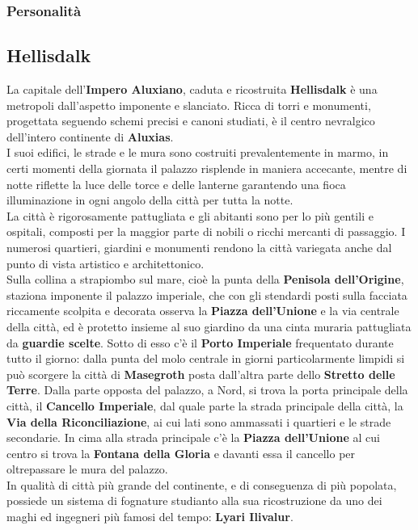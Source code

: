 \documentclass[10pt,twoside,onecolumn,openany]{book}
\begin{document}
\subsubsection{Personalità}
\newpage
\subsection{Hellisdalk}
La capitale dell'\textbf{Impero Aluxiano}, caduta e ricostruita \textbf{Hellisdalk} è una metropoli dall'aspetto imponente e slanciato. Ricca di torri e monumenti, progettata seguendo schemi precisi e canoni studiati, è il centro nevralgico dell'intero continente di \textbf{Aluxias}.\\
I suoi edifici, le strade e le mura sono costruiti prevalentemente in marmo, in certi momenti della giornata il palazzo risplende in maniera accecante, mentre di notte riflette la luce delle torce e delle lanterne garantendo una fioca illuminazione in ogni angolo della città per tutta la notte.\\
La città è rigorosamente pattugliata e gli abitanti sono per lo più gentili e ospitali, composti per la maggior parte di nobili o ricchi mercanti di passaggio. I numerosi quartieri, giardini e monumenti rendono la città variegata anche dal punto di vista artistico e architettonico.\\
Sulla collina a strapiombo sul mare, cioè la punta della \textbf{Penisola dell'Origine}, staziona imponente il palazzo imperiale, che con gli stendardi posti sulla facciata riccamente scolpita e decorata osserva la \textbf{Piazza dell'Unione} e la via centrale della città, ed è protetto insieme al suo giardino da una cinta muraria pattugliata da \textbf{guardie scelte}. Sotto di esso c'è il \textbf{Porto Imperiale} frequentato durante tutto il giorno: dalla punta del molo centrale in giorni particolarmente limpidi si può scorgere la città di \textbf{Masegroth} posta dall'altra parte dello \textbf{Stretto delle Terre}. Dalla parte opposta del palazzo, a Nord, si trova la porta principale della città, il \textbf{Cancello Imperiale}, dal quale parte la strada principale della città, la \textbf{Via della Riconciliazione}, ai cui lati sono ammassati i quartieri e le strade secondarie. In cima alla strada principale c'è la \textbf{Piazza dell'Unione} al cui centro si trova la \textbf{Fontana della Gloria} e davanti essa il cancello per oltrepassare le mura del palazzo.\\
In qualità di città più grande del continente, e di conseguenza di più popolata, possiede un sistema di fognature studianto alla sua ricostruzione da uno dei maghi ed ingegneri più famosi del tempo: \textbf{Lyari Ilivalur}.\\
\end{document}
